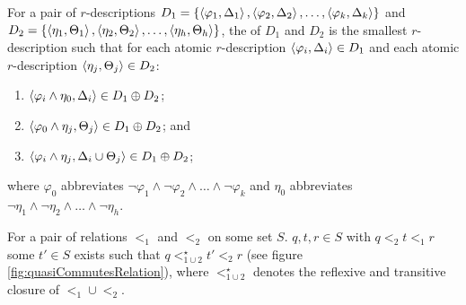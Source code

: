 \begin{defi}
For a pair of $r$-descriptions $D_1=\left\{ \left\langle \varphi_1,\Delta_1\right\rangle,\left\langle \varphi_2,\Delta_2\right\rangle,\ldots,\left\langle \varphi_k,\Delta_k\right\rangle\right\}$ and $D_2=\left\{ \left\langle \eta_1,\Theta_1\right\rangle,\left\langle \eta_2,\Theta_2\right\rangle,\ldots,\left\langle \eta_h,\Theta_h\right\rangle\right\}$, the  of $D_1$ and $D_2$ is the smallest $r$-description such that for each atomic $r$-description $\left\langle \varphi_i,\Delta_i\right\rangle\in D_1$ and each atomic $r$-description $\left\langle \eta_j,\Theta_j\right\rangle\in D_2$:
\begin{enumerate}
 \item $\left\langle \varphi_i\wedge\eta_0,\Delta_i\right\rangle\in D_1\oplus D_2$;
 \item $\left\langle \varphi_0\wedge\eta_j,\Theta_j\right\rangle\in D_1\oplus D_2$; and
 \item $\left\langle \varphi_i\wedge\eta_j,\Delta_i\cup\Theta_j\right\rangle\in D_1\oplus D_2$;
\end{enumerate}
where $\varphi_0$ abbreviates $\neg\varphi_1\wedge\neg\varphi_2\wedge\ldots\wedge\neg\varphi_k$ and $\eta_0$ abbreviates $\neg\eta_1\wedge\neg\eta_2\wedge\ldots\wedge\neg\eta_h$.
\cite{conf/ijcai/Walther93}
\end{defi}

\begin{defi}
For a pair of relations $<_1$ and $<_2$ on some set $S$.  \iffTx{} \faTx{} $q,t,r\in S$ with $q<_2t<_1r$ some $t'\in S$ exists such that $q<_{1\cup2}^{\star}t'<_2r$ (see figure \ref{fig:quasiCommutesRelation}), where $<_{1\cup2}^{\star}$ denotes the reflexive and transitive closure of $<_1\cup<_2$.
\cite{conf/ijcai/Walther93}
\end{defi}

